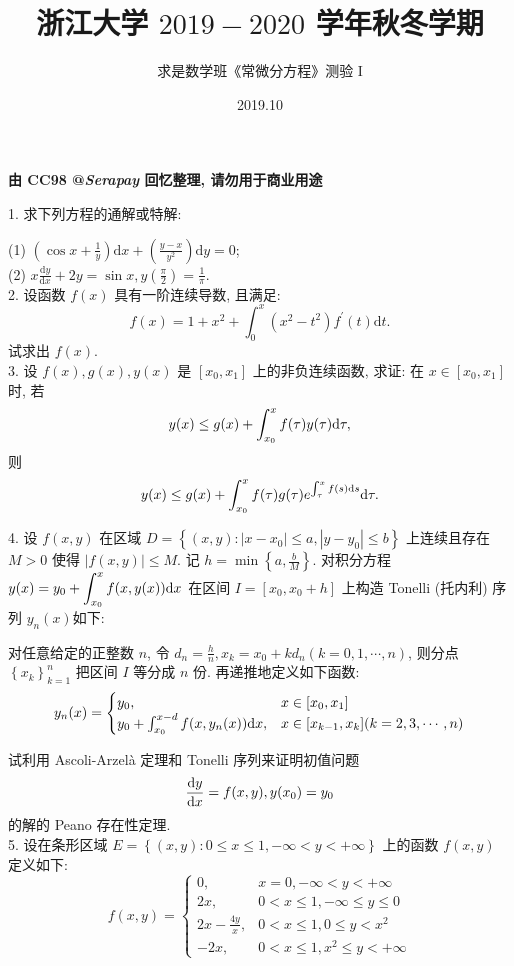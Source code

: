 \documentclass[UTF8]{ctexart}
\title{\textbf{浙江大学 $2019-2020$ 学年秋冬学期}}
\author{求是数学班《常微分方程》测验 I}
\date{2019.10}
\begin{document}
\maketitle

\begin{center}
    \Large{\textbf{由 CC98 @\textit{Serapay} 回忆整理, 请勿用于商业用途}}
\end{center}

1. 求下列方程的通解或特解:

(1) $\displaystyle\left(\cos x+\frac{1}{y}\right)\text{d}x+\left(\frac{y-x}{y^2}\right)\text{d}y=0$;
\\

(2) $\displaystyle x\frac{\text{d}y}{\text{d}x}+2y=\sin x, y\left(\frac{\pi}{2}\right)=\frac{1}{\pi}$.
\\

2. 设函数 $f(x)$ 具有一阶连续导数, 且满足:
\[
f(x)=1+x^2+\int_{0}^{x}(x^2-t^2)f^{\prime}(t)\text{d}t.
\]
试求出 $f(x)$.
\\

3. 设 $f(x),g(x),y(x)$ 是 $[x_0,x_1]$ 上的非负连续函数, 求证: 在 $x\in[x_0,x_1]$ 时, 若
\[
y(x)\leq g(x)+\int_{x_0}^{x}f(\tau)y(\tau){\rm d}\tau,
\]
则
\[
y(x)\leq g(x)+\int_{x_0}^{x}f(\tau)g(\tau)e^{\int_{\tau}^{x}f(s){\rm d}s}{\rm d}\tau.
\]


4. 设 $f(x,y)$ 在区域 $D=\left\{(x,y):|x-x_0|\leq a,|y-y_0|\leq b\right\}$ 上连续且存在 $M>0$ 使得 $|f(x,y)|\leq M$. 记 $\displaystyle h=\min\left\{a,\frac{b}{M}\right\}$. 对积分方程 $\displaystyle y(x)=y_0+\int_{x_0}^{x}f(x,y(x)){\rm d}x$ 在区间 $I=[x_0,x_0+h]$ 上构造 Tonelli (托内利) 序列 $y_n(x)$如下:

对任意给定的正整数 $n$, 令 $\displaystyle d_n=\frac{h}{n},x_k=x_0+kd_n(k=0,1,\cdots,n)$, 则分点 $\displaystyle\left\{x_k\right\}_{k=1}^{n}$ 把区间 $I$ 等分成 $n$ 份. 再递推地定义如下函数:
\[
y_n(x)=
\begin{cases}
  y_0, & x\in[x_0,x_1]\\
  y_0+\int_{x_0}^{x-d}f(x,y_n(x)){\rm d}x, & x\in[x_{k-1},x_k](k=2,3,\cdots,n)
\end{cases}
\]

试利用 Ascoli-Arzel\`{a} 定理和 Tonelli 序列来证明初值问题
\[
\frac{{\rm d}y}{{\rm d}x}=f(x,y),y(x_0)=y_0
\]
的解的 Peano 存在性定理.
\\

5. 设在条形区域 $E=\left\{(x,y):0\leq x\leq1,-\infty<y<+\infty\right\}$ 上的函数 $f(x,y)$ 定义如下:
\[
f(x,y)=
\begin{cases}
  0, & x=0,-\infty<y<+\infty \\
  2x, & 0<x\leq1,-\infty\leq y\leq0 \\
  2x-\displaystyle\frac{4y}{x}, &0<x\leq1,0\leq y<x^2 \\
  -2x, & 0<x\leq1,x^2\leq y<+\infty
\end{cases}
\]
\end{document}
